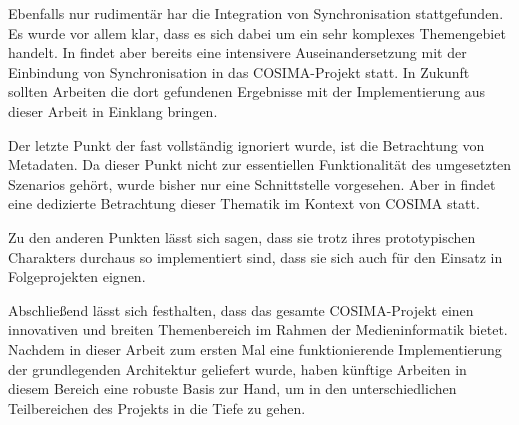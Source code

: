   Ebenfalls nur rudimentär har die Integration von Synchronisation stattgefunden. Es wurde vor allem klar, dass es sich dabei um ein sehr komplexes Themengebiet handelt. In \citep{antons09} findet aber bereits eine intensivere Auseinandersetzung mit der Einbindung von Synchronisation in das COSIMA-Projekt statt. In Zukunft sollten Arbeiten die dort gefundenen Ergebnisse mit der Implementierung aus dieser Arbeit in Einklang bringen.
  
  Der letzte Punkt der fast vollständig ignoriert wurde, ist die Betrachtung von Metadaten. Da dieser Punkt nicht zur essentiellen Funktionalität des umgesetzten Szenarios gehört, wurde bisher nur eine Schnittstelle vorgesehen. Aber in \citep{lehmann09} findet eine dedizierte Betrachtung dieser Thematik im Kontext von COSIMA statt.
  
  Zu den anderen Punkten lässt sich sagen, dass sie trotz ihres prototypischen Charakters durchaus so implementiert sind, dass sie sich auch für den Einsatz in Folgeprojekten eignen.
  
  Abschließend lässt sich festhalten, dass das gesamte COSIMA-Projekt einen innovativen und breiten Themenbereich im Rahmen der Medieninformatik bietet. Nachdem in dieser Arbeit zum ersten Mal eine funktionierende Implementierung der grundlegenden Architektur geliefert wurde, haben künftige Arbeiten in diesem Bereich eine robuste Basis zur Hand, um in den unterschiedlichen Teilbereichen des Projekts in die Tiefe zu gehen.

